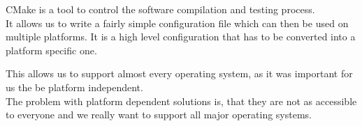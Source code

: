 CMake is a tool to control the software compilation and testing process. \cite{cmake} \\
It allows us to write a fairly simple configuration file which can then be used on multiple platforms.
It is a high level configuration that has to be converted into a platform specific one.

This allows us to support almost every operating system, as it was important for us the be platform independent. \\
The problem with platform dependent solutions is, that they are not as accessible to everyone and we really want to support all major operating systems.
